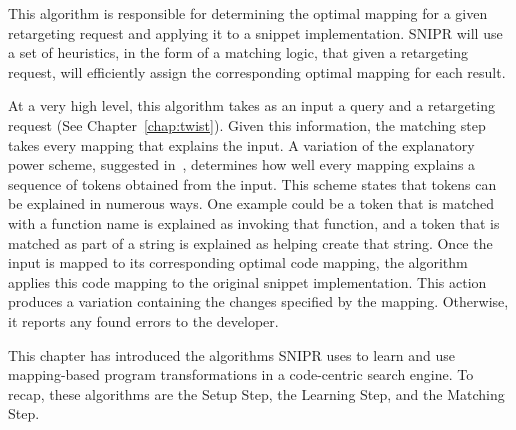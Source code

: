 This algorithm is responsible for determining the optimal mapping for a given retargeting request and applying it to a snippet implementation. \uppercase{SNIPR} will use a set of heuristics, in the form of a matching logic, that given a retargeting request, will efficiently assign the corresponding optimal mapping for each result. 

At a very high level, this algorithm takes as an input a query and a retargeting request (See Chapter~\ref{chap:twist}). Given this information, the matching step takes every mapping that explains the input. A variation of the explanatory power scheme, suggested in~\cite{Little:2008hr}, determines how well every mapping explains a sequence of tokens obtained from the input. This scheme states that tokens can be explained in numerous ways. One example could be a token that is matched with a function name is explained as invoking that function, and a token that is matched as part of a string is explained as helping create that string. Once the input is mapped to its corresponding optimal code mapping, the algorithm applies this code mapping to the original snippet implementation. This action produces a variation containing the changes specified by the mapping. Otherwise, it reports any found errors to the developer. 

This chapter has introduced the algorithms SNIPR uses to learn and use mapping-based program transformations in a code-centric search engine. To recap, these algorithms are the Setup Step, the Learning Step, and the Matching Step.
